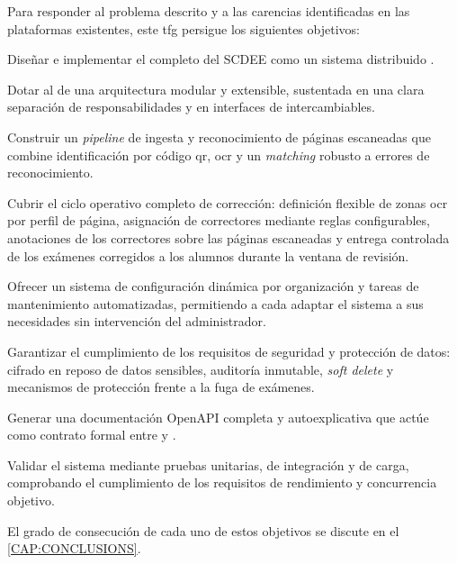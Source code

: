 Para responder al problema descrito y a las carencias identificadas en las
plataformas existentes, este \acs{tfg} persigue los siguientes objetivos:

\begin{objetive}
  \item Diseñar e implementar el  completo del SCDEE como un
        sistema distribuido .
        \label{OBJ:BACKEND-MULTITENANT}
  \item Dotar al  de una arquitectura modular y extensible,
        sustentada en una clara separación de responsabilidades y en
        interfaces de  intercambiables.
        \label{OBJ:MODULAR-ARCH}
  \item Construir un \textit{pipeline} de ingesta y reconocimiento de
        páginas escaneadas que combine identificación por código \acs{qr},
        \acs{ocr} y un \textit{matching} robusto a errores de
        reconocimiento.
        \label{OBJ:OCR-PIPELINE}
  \item Cubrir el ciclo operativo completo de corrección: definición
        flexible de zonas \acs{ocr} por perfil de página, asignación de
        correctores mediante reglas configurables, anotaciones de los
        correctores sobre las páginas escaneadas y entrega controlada de
        los exámenes corregidos a los alumnos durante la ventana de
        revisión.
        \label{OBJ:GRADING-CYCLE}
  \item Ofrecer un sistema de configuración dinámica por organización y
        tareas de mantenimiento automatizadas, permitiendo a cada
         adaptar el sistema a sus necesidades sin intervención
        del administrador.
        \label{OBJ:CONFIG-MAINTENANCE}
  \item Garantizar el cumplimiento de los requisitos de seguridad y
        protección de datos: cifrado en reposo de datos sensibles,
        auditoría inmutable, \textit{soft delete} y mecanismos de
        protección frente a la fuga de exámenes.
        \label{OBJ:SECURITY-RGPD}
  \item Generar una documentación OpenAPI completa y autoexplicativa que
        actúe como contrato formal entre  y .
        \label{OBJ:OPENAPI-CONTRACT}
  \item Validar el sistema mediante pruebas unitarias, de integración y de
        carga, comprobando el cumplimiento de los requisitos de rendimiento
        y concurrencia objetivo.
        \label{OBJ:VALIDATION}
\end{objetive}

El grado de consecución de cada uno de estos objetivos se discute en
el \cref{CAP:CONCLUSIONS}.
